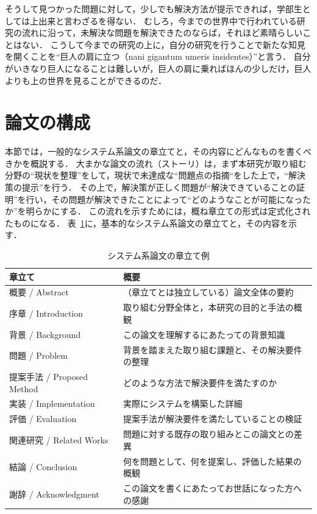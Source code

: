 そうして見つかった問題に対して，少しでも解決方法が提示できれば，学部生としては上出来と言わざるを得ない．
むしろ，今までの世界中で行われている研究の流れに沿って，未解決な問題を解決できたのならば，それほど素晴らしいことはない．
こうして今までの研究の上に，自分の研究を行うことで新たな知見を開くことを``巨人の肩に立つ（nani gigantum umeris insidentes）''と言う．
自分がいきなり巨人になることは難しいが，巨人の肩に乗ればほんの少しだけ，巨人よりも上の世界を見ることができるのだ．

\section{論文の構成}
\label{background:structure}
本節では，一般的なシステム系論文の章立てと，その内容にどんなものを書くべきかを概説する．
大まかな論文の流れ（ストーリ）は，まず本研究が取り組む分野の``現状を整理''をして，現状で未達成な``問題点の指摘``をした上で，``解決策の提示''を行う．
その上で，解決策が正しく問題が``解決できていることの証明''を行い，その問題が解決できたことによって``どのようなことが可能になったか''を明らかにする．
この流れを示すためには，概ね章立ての形式は定式化されたものになる．
表~\ref{table:structurepaper}に，基本的なシステム系論文の章立てと，その内容を示す．

\begin{table}[!hbtp]
    \begin{center}
        \caption{システム系論文の章立て例}
				\label{table:structurepaper}
  			\begin{tabular}{|l|l|}
					\hline
          章立て & 概要 \\
					\hline
          概要 / Abstract & （章立てとは独立している）論文全体の要約 \\
					\hline
          序章 / Introduction & 取り組む分野全体と，本研究の目的と手法の概観\\
					\hline
          背景 / Background & この論文を理解するにあたっての背景知識\\
					\hline
          問題 / Problem & 背景を踏まえた取り組む課題と、その解決要件の整理 \\
					\hline
          提案手法 / Proposed Method & どのような方法で解決要件を満たすのか \\
					\hline
          実装 / Implementation & 実際にシステムを構築した詳細 \\
					\hline
          評価 / Evaluation & 提案手法が解決要件を満たしていることの検証 \\
					\hline
          関連研究 / Related Works & 問題に対する既存の取り組みとこの論文との差異 \\
					\hline
          結論 / Conclusion & 何を問題として、何を提案し、評価した結果の概観\\
  				\hline
					\hline
          謝辞 / Acknowledgment & この論文を書くにあたってお世話になった方への感謝\\
  				\hline
				\end{tabular}
		\end{center}
\end{table}

